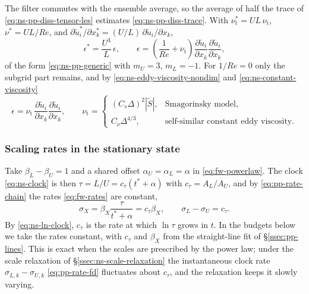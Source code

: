 \documentclass{article}
\begin{document}
The filter commutes with the ensemble average, so the average of half the
trace of \eqref{eq:ns-pp-diss-tensor-les} estimates
\eqref{eq:ns-pp-diss-trace}. With $\nu_{\mathrm{t}}^* = UL\, \nu_{\mathrm{t}}$,
$\nu^* = UL/Re$, and
$\partial \tilde u_i^*/\partial x_k^* = (U/L)\, \partial \tilde u_i/\partial x_k$,
\begin{equation}\label{eq:ns-pp-diss-nondim}
  \epsilon^* = \frac{U^3}{L}\, \epsilon,
  \qquad
  \epsilon = \left( \frac{1}{Re} + \nu_{\mathrm{t}} \right) \frac{\partial \tilde u_i}{\partial x_k} \frac{\partial \tilde u_i}{\partial x_k},
\end{equation}
of the form \eqref{eq:ns-pp-generic} with $m_U = 3$, $m_L = -1$. For
$1/Re = 0$ only the subgrid part remains, and by
\eqref{eq:ns-eddy-viscosity-nondim} and \eqref{eq:ns-constant-viscosity}
\begin{equation}\label{eq:ns-pp-diss-models}
  \epsilon = \nu_{\mathrm{t}}\, \frac{\partial \tilde u_i}{\partial x_k} \frac{\partial \tilde u_i}{\partial x_k},
  \qquad
  \nu_{\mathrm{t}} =
  \begin{cases}
    (C_s \Delta)^2 |\tilde S|, & \text{Smagorinsky model}, \\
    C_\nu \Delta^{4/3}, & \text{self-similar constant eddy viscosity}.
  \end{cases}
\end{equation}

\subsubsection{Scaling rates in the stationary state}\label{sssec:ns-pp-rates}
Take $\beta_L - \beta_U = 1$ and a shared offset $\alpha_U = \alpha_L = \alpha$
in \eqref{eq:fw-powerlaw}. The clock \eqref{eq:ns-clock} is then
$\tau = L/U = c_\tau (t^* + \alpha)$ with $c_\tau = A_L/A_U$, and by
\eqref{eq:pp-rate-chain} the rates \eqref{eq:fw-rates} are constant,
\begin{equation}\label{eq:ns-pp-rates}
  \sigma_X = \beta_X \frac{\tau}{t^* + \alpha} = c_\tau \beta_X ,
  \qquad
  \sigma_L - \sigma_U = c_\tau .
\end{equation}
By \eqref{eq:ns-ln-clock}, $c_\tau$ is the rate at which $\ln \tau$ grows in
$t$. In the budgets below we take the rates constant, with $c_\tau$ and
$\beta_X$ from the straight-line fit of \S\ref{ssec:pp-lines}. This is exact
when the scales are prescribed by the power law; under the scale relaxation of
\S\ref{ssec:ns-scale-relaxation} the instantaneous clock rate
$\sigma_{L,k} - \sigma_{U,k}$ \eqref{eq:pp-rate-fd} fluctuates about
$c_\tau$, and the relaxation keeps it slowly varying.
\end{document}
